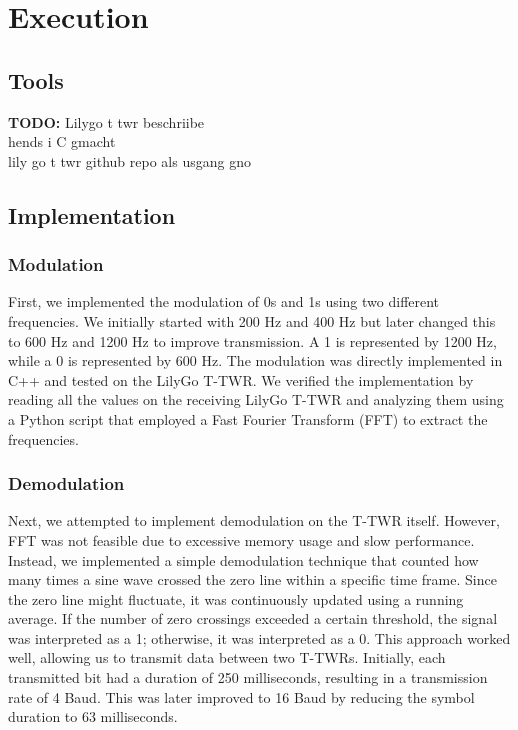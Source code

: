 \chapter{Execution}
\section{Tools}
\textbf{TODO: } Lilygo t twr beschriibe \\
hends i C gmacht \\
lily go t twr github repo als usgang gno 

\section{Implementation}

\subsection{Modulation}

First, we implemented the modulation of 0s and 1s using two different frequencies. We initially started with 200 Hz and 400 Hz but later changed this to 600 Hz and 1200 Hz to improve transmission. A 1 is represented by 1200 Hz, while a 0 is represented by 600 Hz. The modulation was directly implemented in C++ and tested on the LilyGo T-TWR. We verified the implementation by reading all the values on the receiving LilyGo T-TWR and analyzing them using a Python script that employed a Fast Fourier Transform (FFT) to extract the frequencies.

\subsection{Demodulation}

Next, we attempted to implement demodulation on the T-TWR itself. However, FFT was not feasible due to excessive memory usage and slow performance. Instead, we implemented a simple demodulation technique that counted how many times a sine wave crossed the zero line within a specific time frame. Since the zero line might fluctuate, it was continuously updated using a running average. If the number of zero crossings exceeded a certain threshold, the signal was interpreted as a 1; otherwise, it was interpreted as a 0. This approach worked well, allowing us to transmit data between two T-TWRs. Initially, each transmitted bit had a duration of 250 milliseconds, resulting in a transmission rate of 4 Baud. This was later improved to 16 Baud by reducing the symbol duration to 63 milliseconds.

